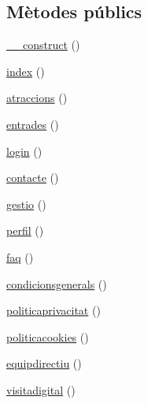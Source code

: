 \subsection*{Mètodes públics}
\begin{DoxyCompactItemize}
\item 
\mbox{\hyperlink{class_app_1_1_http_1_1_controllers_1_1_home_controller_a095c5d389db211932136b53f25f39685}{\+\_\+\+\_\+construct}} ()
\item 
\mbox{\hyperlink{class_app_1_1_http_1_1_controllers_1_1_home_controller_a149eb92716c1084a935e04a8d95f7347}{index}} ()
\item 
\mbox{\hyperlink{class_app_1_1_http_1_1_controllers_1_1_home_controller_a8cc1e5e6927209e7d5229d7954b1619e}{atraccions}} ()
\item 
\mbox{\hyperlink{class_app_1_1_http_1_1_controllers_1_1_home_controller_a5d8df23b95a7795f96d4ed0c73a6f98c}{entrades}} ()
\item 
\mbox{\hyperlink{class_app_1_1_http_1_1_controllers_1_1_home_controller_aa311da27ba5706f5710cea7706c8eae1}{login}} ()
\item 
\mbox{\hyperlink{class_app_1_1_http_1_1_controllers_1_1_home_controller_a46db989f1e59c4930c32693ab33a4484}{contacte}} ()
\item 
\mbox{\hyperlink{class_app_1_1_http_1_1_controllers_1_1_home_controller_ab1818f9417d15cbab8e90a83c49655b8}{gestio}} ()
\item 
\mbox{\hyperlink{class_app_1_1_http_1_1_controllers_1_1_home_controller_ab6536894d0373d162675f627c94f3dd0}{perfil}} ()
\item 
\mbox{\hyperlink{class_app_1_1_http_1_1_controllers_1_1_home_controller_a2a67d47c6258ea0b58b3509131aa3081}{faq}} ()
\item 
\mbox{\hyperlink{class_app_1_1_http_1_1_controllers_1_1_home_controller_adb1720665db4b792a27b93b98589369f}{condicionsgenerals}} ()
\item 
\mbox{\hyperlink{class_app_1_1_http_1_1_controllers_1_1_home_controller_a1d4df3c5c5640560ec9555ed002fe508}{politicaprivacitat}} ()
\item 
\mbox{\hyperlink{class_app_1_1_http_1_1_controllers_1_1_home_controller_a174421463aa48e211f1bc61aedd61908}{politicacookies}} ()
\item 
\mbox{\hyperlink{class_app_1_1_http_1_1_controllers_1_1_home_controller_a1ebc6c4441e830c46814ad7fc7956a6d}{equipdirectiu}} ()
\item 
\mbox{\hyperlink{class_app_1_1_http_1_1_controllers_1_1_home_controller_a096e2d1a19bebdd25e74bab5719da650}{visitadigital}} ()

\end{DoxyCompactItemize}
